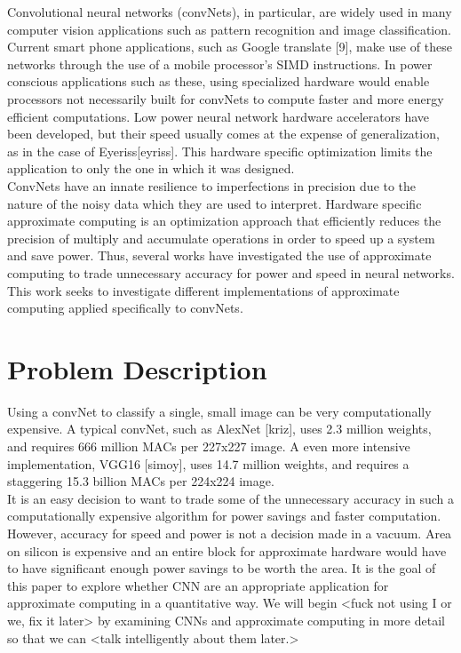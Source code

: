 \documentclass[conference]{IEEEtran}
\begin{document}
	\indent Convolutional neural networks (convNets), in particular, are widely used in many computer vision applications such as pattern recognition and image classification. Current smart phone applications, such as Google translate [9], make use of these networks through the use of a mobile processor's SIMD instructions. In power conscious applications such as these, using specialized hardware would enable processors not necessarily built for convNets to compute faster and more energy efficient computations. Low power neural network hardware accelerators have been developed, but their speed usually comes at the expense of generalization, as in the case of Eyeriss[eyriss]. This hardware specific optimization limits the application to only the one in which it was designed. \\	
	
	\indent ConvNets have an innate resilience to imperfections in precision due to the nature of the noisy data which they are used to interpret. Hardware specific approximate computing is an optimization approach that efficiently reduces the precision of multiply and accumulate operations in order to speed up a system and save power. Thus, several works have investigated the use of approximate computing to trade unnecessary accuracy for power and speed in neural networks. This work seeks to investigate different implementations of approximate computing applied specifically to convNets. 
	
\section{Problem Description}
	\indent Using a convNet to classify a single, small image can be very computationally expensive. A typical convNet, such as AlexNet [kriz], uses 2.3 million weights, and requires 666 million MACs per 227x227 image. A even more intensive implementation, VGG16 [simoy], uses 14.7 million weights, and requires a staggering 15.3 billion MACs per 224x224 image.\\
	
	\indent It is an easy decision to want to trade some of the unnecessary accuracy in such a computationally expensive algorithm for power savings and faster computation. However, accuracy for speed and power is not a decision made in a vacuum. Area on silicon is expensive and an entire block for approximate hardware would have to have significant enough power savings to be worth the area. It is the goal of this paper to explore whether CNN are an appropriate application for approximate computing in a quantitative way. We will begin <fuck not using I or we, fix it later> by examining CNNs and approximate computing in more detail so that we can <talk intelligently about them later.>
\end{document}
